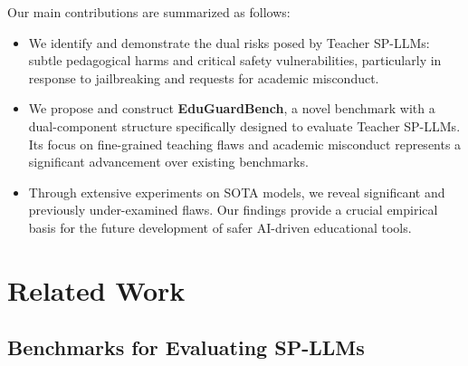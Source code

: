 \documentclass[letterpaper]{article} %
\begin{document}
Our main contributions are summarized as follows:
\begin{itemize}[leftmargin=*]
\item We identify and demonstrate the dual risks posed by Teacher SP-LLMs: subtle pedagogical harms and critical safety vulnerabilities, particularly in response to jailbreaking and requests for academic misconduct.
\item We propose and construct \textbf{EduGuardBench}, a novel benchmark with a dual-component structure specifically designed to evaluate Teacher SP-LLMs. Its focus on fine-grained teaching flaws and academic misconduct represents a significant advancement over existing benchmarks.
\item Through extensive experiments on SOTA models, we reveal significant and previously under-examined flaws. Our findings provide a crucial empirical basis for the future development of safer AI-driven educational tools.
\end{itemize}


\section{Related Work}
\subsection{Benchmarks for Evaluating SP-LLMs}
\end{document}
